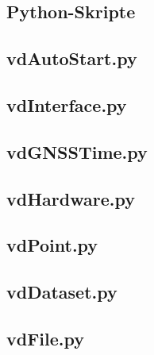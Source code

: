 \documentclass[a4paper,12pt,bibliography=totoc, listof=totoc,titlepage,pointlessnumbers]{scrreprt}
\begin{document}
\renewcommand{\appendixpagename}{\appendixname} 
\renewcommand{\appendixtocname}{\appendixname} 
\begin{appendices}

\chapter{Python-Skripte}
\label{a:skripte}
\section{vdAutoStart.py}
\label{a:vdAutoStart.py}


\section{vdInterface.py}
\label{a:vdInterface.py}


\section{vdGNSSTime.py}
\label{a:vdGNSSTime.py}


\section{vdHardware.py}
\label{a:vdHardware.py}


\section{vdPoint.py}
\label{a:vdPoint.py}


\section{vdDataset.py}
\label{a:vdDataset.py}


\section{vdFile.py}
\label{a:vdFile.py}



\end{appendices}
\end{document}
